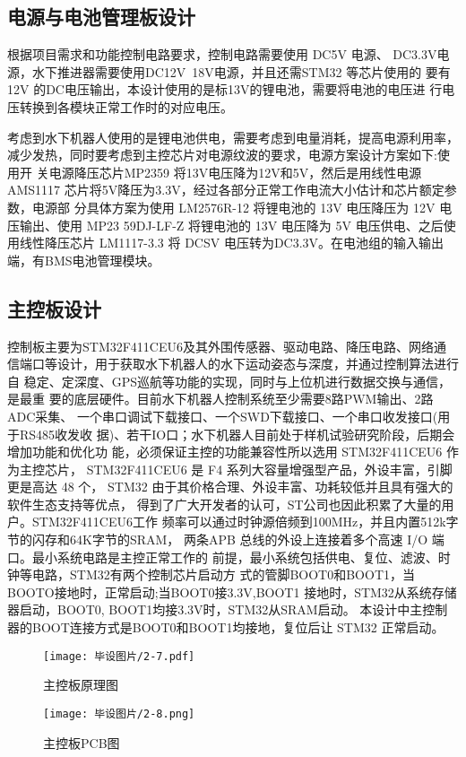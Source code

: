 \subsection{电源与电池管理板设计}
根据项目需求和功能控制电路要求，控制电路需要使用 DC5V 电源、
DC3.3V电源，水下推进器需要使用DC12V~18V电源，并且还需STM32 等芯片使用的
要有12V 的DC电压输出，本设计使用的是标13V的锂电池，需要将电池的电压进
行电压转换到各模块正常工作时的对应电压。

考虑到水下机器人使用的是锂电池供电，需要考虑到电量消耗，提高电源利用率，
减少发热，同时要考虑到主控芯片对电源纹波的要求，电源方案设计方案如下:使用开
关电源降压芯片MP2359 将13V电压降为12V和5V，然后是用线性电源AMS1117
芯片将5V降压为3.3V，经过各部分正常工作电流大小估计和芯片额定参数，电源部
分具体方案为使用 LM2576R-12 将锂电池的 13V 电压降压为 12V 电压输出、使用
MP23 59DJ-LF-Z 将锂电池的 13V 电压降为 5V 电压供电、之后使用线性降压芯片
LM1117-3.3 将 DCSV 电压转为DC3.3V。在电池组的输入输出端，有BMS电池管理模块。



\subsection{主控板设计}
\label{sec:2.3.2}
控制板主要为STM32F411CEU6及其外围传感器、驱动电路、降压电路、网络通
信端口等设计，用于获取水下机器人的水下运动姿态与深度，并通过控制算法进行自
稳定、定深度、GPS巡航等功能的实现，同时与上位机进行数据交换与通信，是最重
要的底层硬件。目前水下机器人控制系统至少需要8路PWM输出、2路ADC采集、
一个串口调试下载接口、一个SWD下载接口、一个串口收发接口(用于RS485收发收
据)、若干IO口；水下机器人目前处于样机试验研究阶段，后期会增加功能和优化功
能，必须保证主控的功能兼容性所以选用 STM32F411CEU6 作为主控芯片，
STM32F411CEU6 是 F4 系列大容量增强型产品，外设丰富，引脚更是高达 48 个，
STM32 由于其价格合理、外设丰富、功耗较低并且具有强大的软件生态支持等优点，
得到了广大开发者的认可，ST公司也因此积累了大量的用户。STM32F411CEU6工作
频率可以通过时钟源倍频到100MHz，并且内置512k字节的闪存和64K字节的SRAM，
两条APB 总线的外设上连接着多个高速 I/O 端口。最小系统电路是主控正常工作的
前提，最小系统包括供电、复位、滤波、时钟等电路，STM32有两个控制芯片启动方
式的管脚BOOT0和BOOT1，当 BOOTO接地时，正常启动;当BOOT0接3.3V,BOOT1
接地时，STM32从系统存储器启动，BOOT0, BOOT1均接3.3V时，STM32从SRAM启动。
本设计中主控制器的BOOT连接方式是BOOT0和BOOT1均接地，复位后让
STM32 正常启动。 
\begin{figure}[htbp]
    \centering
    \texttt{[image: 毕设图片/2-7.pdf]}
    \caption{\label{fig:2-7}主控板原理图}
\end{figure}
\begin{figure}[htbp]
    \centering
    \texttt{[image: 毕设图片/2-8.png]}
    \caption{\label{fig:2-8}主控板PCB图}
\end{figure}

